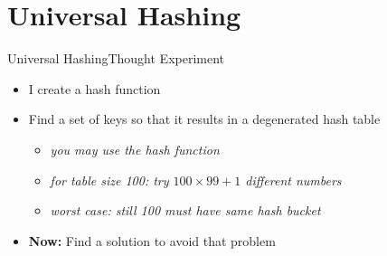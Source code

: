 \section{Universal Hashing}


\begin{frame}{Universal Hashing}{Thought Experiment}
  \begin{itemize}
    \setlength\itemsep{1.5em}
    \item <1->
      I create a hash function
    \item <2->
      Find a set of keys so that it results in a degenerated hash table
      \begin{itemize}
        \item<3->{\it you may use the hash function}\\
        \item<4->{\it for table size 100: try $100\times 99 +1$ different numbers }\\
       \item<5->{\it worst case:  still 100 must have same hash
          bucket }
      \end{itemize}
    \item <5->
      \textbf{Now:} Find a solution to avoid that problem
      
  \end{itemize}
\end{frame}



